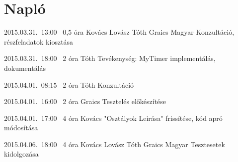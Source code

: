 %
\pagebreak
\section{Napló}

\begin{naplo}

\bejegyzes
{2015.03.31.~13:00~} %
{0,5 óra} %
{Kovács\newline
Lovász\newline
Tóth\newline
Graics\newline
Magyar
} %
{Konzultáció, részfeladatok kiosztása} %

\bejegyzes
{2015.03.31.~18:00~}
{2 óra}
{Tóth}
{Tevékenység: MyTimer implementálás, dokumentálás}

\bejegyzes
{2015.04.01.~08:15~} %
{2 óra} %
{Tóth} %
{Konzultáció} %

\bejegyzes
{2015.04.01.~16:00~} %
{2 óra} %
{Graics} %
{Tesztelés előkészítése} %

\bejegyzes
{2015.04.01.~17:00~} %
{4 óra} %
{Kovács} %
{"Osztályok Leirása" frissítése,\newline
kód apró módosítása} %

\bejegyzes
{2015.04.06.~18:00~} %
{4 óra} %
{Kovács\newline
Lovász\newline
Tóth\newline
Graics\newline
Magyar} %
{Tesztesetek kidolgozása} %

\end{naplo}

